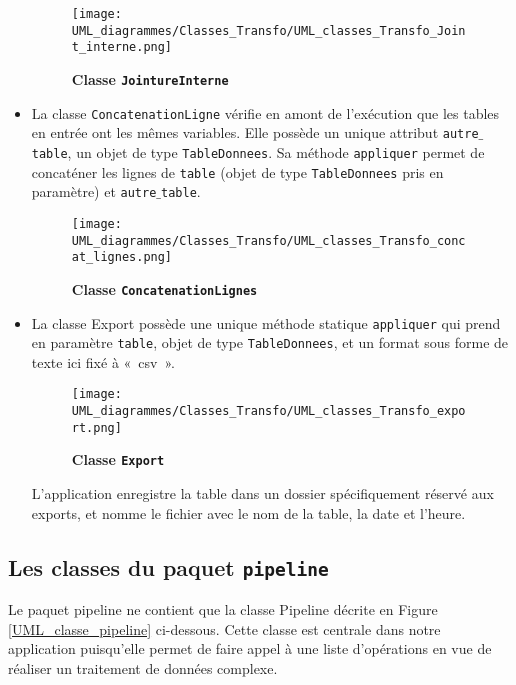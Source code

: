 \documentclass[11pt]{article}
\begin{document}
\begin{itemize}
    \begin{figure}[H]
    \caption{\textbf{Classe \texttt{JointureInterne}}}
    \label{UML_classe_jointure_interne}
    \centering
    \texttt{[image: UML\_diagrammes/Classes\_Transfo/UML\_classes\_Transfo\_Joint\_interne.png]}
    \end{figure}
    
    \item La classe \texttt{ConcatenationLigne} vérifie en amont de l'exécution que les tables en entrée ont les mêmes variables. Elle possède un unique attribut \texttt{autre$\_$table}, un objet de type \texttt{TableDonnees}. Sa méthode \texttt{appliquer} permet de concaténer les lignes de \texttt{table} (objet de type \texttt{TableDonnees} pris en paramètre) et \texttt{autre$\_$table}.

    \begin{figure}[H]
    \caption{\textbf{Classe \texttt{ConcatenationLignes}}}
    \label{UML_classe_concat_lignes}
    \centering
    \texttt{[image: UML\_diagrammes/Classes\_Transfo/UML\_classes\_Transfo\_concat\_lignes.png]}
    \end{figure}
    
    \item La classe Export possède une unique méthode statique \texttt{appliquer} qui prend en paramètre \texttt{table}, objet de type \texttt{TableDonnees}, et un format sous forme de texte ici fixé à «~csv~».
    
    \begin{figure}[H]
    \caption{\textbf{Classe \texttt{Export}}}
    \label{UML_classe_export}
    \centering
    \texttt{[image: UML\_diagrammes/Classes\_Transfo/UML\_classes\_Transfo\_export.png]}
    \end{figure}
    
     L'application enregistre la table dans un dossier spécifiquement réservé aux exports, et nomme le fichier avec le nom de la table, la date et l'heure. 
    
\end{itemize}





\subsection{Les classes du paquet \texttt{pipeline}}
Le paquet pipeline ne contient que la classe Pipeline décrite en Figure \ref{UML_classe_pipeline} ci-dessous. Cette classe est centrale dans notre application puisqu'elle permet de faire appel à une liste d'opérations en vue de réaliser un traitement de données complexe.  
\end{document}
